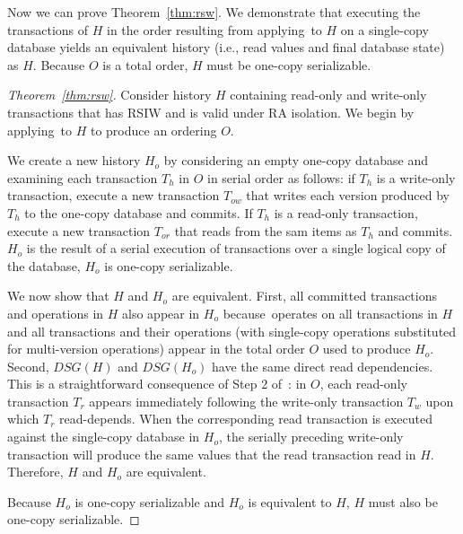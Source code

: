 Now we can prove Theorem~\ref{thm:rsw}. We demonstrate that executing
the transactions of $H$ in the order resulting from
applying~\transform to $H$ on a single-copy database yields an
equivalent history (i.e., read values and final database state) as
$H$. Because $O$ is a total order, $H$ must be one-copy serializable.
\begin{proof}[Theorem~\ref{thm:rsw}]
  Consider history $H$ containing read-only and write-only
  transactions that has RSIW and is valid under RA
  isolation. We begin by applying~\transform to $H$ to produce an
  ordering $O$. 

  We create a new history $H_o$ by considering an empty one-copy
  database and examining each transaction $T_h$ in $O$ in serial order
  as follows: if $T_h$ is a write-only transaction, execute a new
  transaction $T_{ow}$ that writes each version produced by $T_h$ to
  the one-copy database and commits. If $T_h$ is a read-only
  transaction, execute a new transaction $T_{or}$ that reads from the
  sam items as $T_h$ and commits. $H_o$ is the result of a serial
  execution of transactions over a single logical copy of the
  database, $H_o$ is one-copy serializable.

  We now show that $H$ and $H_o$ are equivalent. First, all committed
  transactions and operations in $H$ also appear in $H_o$
  because~\transform operates on all transactions in $H$ and all
  transactions and their operations (with single-copy operations
  substituted for multi-version operations) appear in the total order
  $O$ used to produce $H_o$. Second, $DSG(H)$ and $DSG(H_o)$ have the
  same direct read dependencies. This is a straightforward consequence
  of Step 2 of~\transform: in $O$, each read-only transaction $T_r$
  appears immediately following the write-only transaction $T_w$ upon
  which $T_r$ read-depends. When the corresponding read transaction is
  executed against the single-copy database in $H_o$, the serially
  preceding write-only transaction will produce the same values that
  the read transaction read in $H$. Therefore, $H$ and $H_o$ are equivalent.

  Because $H_o$ is one-copy serializable and $H_o$ is equivalent to $H$, $H$
  must also be one-copy serializable.
\end{proof}

